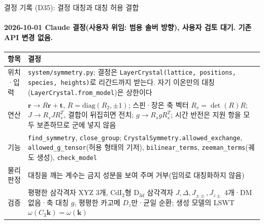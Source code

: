 \begin{frame}[label=decisions-d35-symmetry]{결정 기록 (D35): 결정 대칭과 대칭 허용 결합}
  \framesubtitle{2026-10-01 Claude 결정(사용자 위임: 범용 솔버 방향), 사용자 검토 대기. 기존 API 변경 없음.}
  \small\renewcommand{\arraystretch}{1.12}
  \begin{tabularx}{\textwidth}{@{}P{3.0cm}Y@{}}
    \toprule
    항목 & 결정 \\
    \midrule
    위치·입력 & \texttt{system/symmetry.py}; 결정은 \texttt{LayerCrystal(lattice, positions, species, heights)}로 리간드까지 받는다. 자기 이온만의 대칭(\texttt{LayerCrystal.from\_model})은 상한이다 \\
    연산 & $\mathbf r\to R\mathbf r+\mathbf t$, $R=\mathrm{diag}(R_2,\pm1)$; 스핀·장은 축 벡터 $R_s=\det(R)R$; $J\to R_sJR_s^{T}$, 결합이 뒤집히면 전치; $g\to R_sgR_s^{T}$; 시간 반전은 지원 항을 모두 보존하므로 군에 넣지 않음 \\
    기능 & \texttt{find\_symmetry}, \texttt{close\_group}; \texttt{CrystalSymmetry.allowed\_exchange}, \texttt{allowed\_g\_tensor}(허용 형태의 기저), \texttt{bilinear\_terms}, \texttt{zeeman\_terms}(궤도 생성), \texttt{check\_model} \\
    물리 판정 & 대칭을 깨는 계수는 금지 성분을 보여 주며 거부(임의로 대칭화하지 않음) \\
    검증 & 평평한 삼각격자 XYZ 3개, CdI$_2$형 D$_{3d}$ 삼각격자 $J,\Delta,J_{\pm\pm},J_{z\pm}$ 4개·DM 없음·축 대칭 $g$, 평평한 카고메 $D_z$만·균일 순환; 생성 모델의 LSWT $\omega(C_3\mathbf k)=\omega(\mathbf k)$ \\
    \bottomrule
  \end{tabularx}
\end{frame}

